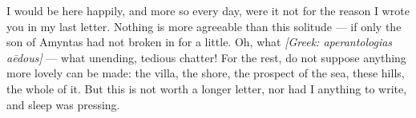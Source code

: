 

 I would be here happily, and more so every day, were it not for the reason I wrote you in my last letter. Nothing is more agreeable than this solitude --- if only the son of Amyntas had not broken in for a little. Oh, what \textit{[Greek: aperantologias a\=edous]} --- what unending, tedious chatter! For the rest, do not suppose anything more lovely can be made: the villa, the shore, the prospect of the sea, these hills, the whole of it. But this is not worth a longer letter, nor had I anything to write, and sleep was pressing.
